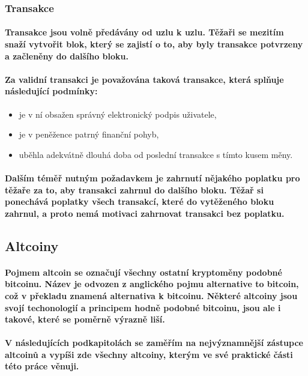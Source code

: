 \documentclass[thesis=B,czech]{FITthesis}[2019/03/21]
\begin{document}
\subsubsection{Transakce}
\paragraph{
Transakce jsou volně předávány od uzlu k uzlu. Těžaři se mezitím snaží vytvořit blok, který se zajistí o to, aby byly transakce potvrzeny a začleněny do dalšího bloku.
}
\paragraph{
Za validní transakci je považována taková transakce, která splňuje následující podmínky:
}
\begin{itemize}
    \item je v ní obsažen správný elektronický podpis uživatele,
    \item je v peněžence patrný finanční pohyb,
    \item uběhla adekvátně dlouhá doba od poslední transakce s tímto kusem měny. \cite{Finex_blockchain}
\end{itemize}
\paragraph{
Dalším téměř nutným požadavkem je zahrnutí nějakého poplatku pro těžaře za to, aby transakci zahrnul do dalšího bloku. Těžař si ponechává poplatky všech transakcí, které do vytěženého bloku zahrnul, a proto nemá motivaci zahrnovat transakci bez poplatku. \cite{Finex_blockchain}
}

\subsection{Altcoiny}
\paragraph{
Pojmem altcoin se označují všechny ostatní kryptoměny podobné bitcoinu. Název je odvozen z anglického pojmu alternative to bitcoin, což v překladu znamená alternativa k bitcoinu. Některé altcoiny jsou svojí techonologií a principem hodně podobné bitcoinu, jsou ale i takové, které se poměrně výrazně liší. \cite{altcoin}
}
\paragraph{
V následujících podkapitolách se zaměřím na nejvýznamnější zástupce altcoinů a vypíši zde všechny altcoiny, kterým ve své praktické části této práce věnuji.
}
\end{document}
